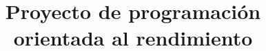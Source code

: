

\title{Proyecto de programación orientada al rendimiento}



\maketitle

\pagestyle{fancyplain}




